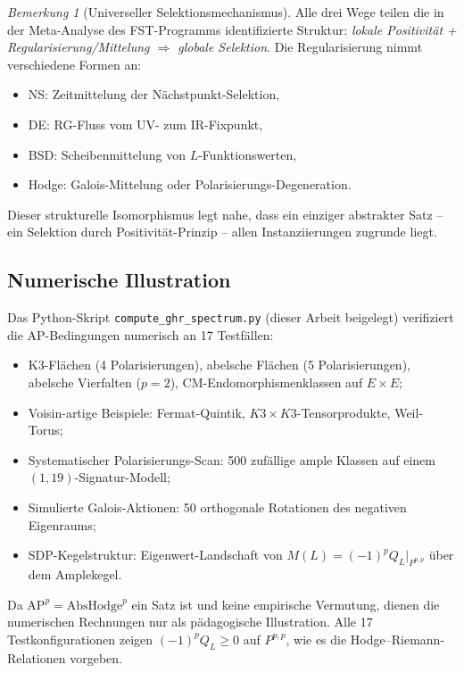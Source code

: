 \documentclass[aps,prd,twocolumn,superscriptaddress,nofootinbib]{revtex4-2}
\theoremstyle{definition}
\theoremstyle{remark}
\newtheorem{remark}[theorem]{Bemerkung}
\begin{document}
\begin{remark}[Universeller Selektionsmechanismus]
\label{rem:universal-selection}
Alle drei Wege teilen die in der Meta-Analyse des FST-Programms identifizierte Struktur: \emph{lokale Positivität + Regularisierung/Mittelung $\Rightarrow$ globale Selektion}. Die \glqq Regularisierung\grqq{} nimmt verschiedene Formen an:
\begin{itemize}
\item NS: Zeitmittelung der Nächstpunkt-Selektion,
\item DE: RG-Fluss vom UV- zum IR-Fixpunkt,
\item BSD: Scheibenmittelung von $L$-Funktionswerten,
\item Hodge: Galois-Mittelung oder Polarisierungs-Degeneration.
\end{itemize}
Dieser strukturelle Isomorphismus legt nahe, dass ein einziger abstrakter Satz -- ein \glqq Selektion durch Positivität\grqq{}-Prinzip -- allen Instanziierungen zugrunde liegt.
\end{remark}

\subsection{Numerische Illustration}

Das Python-Skript \texttt{compute\_ghr\_spectrum.py} (dieser Arbeit beigelegt) verifiziert die AP-Bedingungen numerisch an 17 Testfällen:
\begin{itemize}
\item K3-Flächen (4 Polarisierungen), abelsche Flächen (5 Polarisierungen), abelsche Vierfalten ($p = 2$), CM-Endomorphismenklassen auf $E \times E$;
\item Voisin-artige Beispiele: Fermat-Quintik, $K3 \times K3$-Tensorprodukte, Weil-Torus;
\item Systematischer Polarisierungs-Scan: 500 zufällige ample Klassen auf einem $(1, 19)$-Signatur-Modell;
\item Simulierte Galois-Aktionen: 50 orthogonale Rotationen des negativen Eigenraums;
\item SDP-Kegelstruktur: Eigenwert-Landschaft von $M(L) = (-1)^p Q_L|_{P^{p,p}}$ über dem Amplekegel.
\end{itemize}

Da $\mathrm{AP}^p = \mathrm{AbsHodge}^p$ ein Satz ist und keine empirische Vermutung, dienen die numerischen Rechnungen nur als pädagogische Illustration. Alle 17 Testkonfigurationen zeigen $(-1)^p Q_L \geq 0$ auf $P^{p,p}$, wie es die Hodge--Riemann-Relationen vorgeben.
\end{document}
